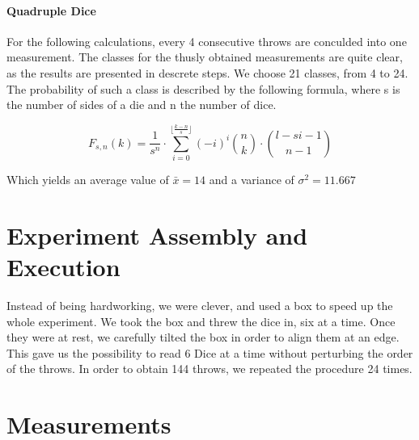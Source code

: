 \documentclass{scrreprt}
\begin{document}
\paragraph{Quadruple Dice}
For the following calculations, every 4 consecutive throws are conculded into one measurement. The classes for the thusly obtained measurements are quite clear, as the results are presented in descrete steps. We choose 21 classes, from 4 to 24.
The probability of such a class is described by the following formula\cite{dicewiki}, where s is the number of sides of a die and n the number of dice.

\begin{equation}
F_{s,n}(k)= \frac{1}{s^n}\cdot\sum_{i=0}^{\lfloor\frac{k-n}{s} \rfloor}(-i)^i\binom{n}{k}\cdot\binom{l-si-1}{n-1}
\end{equation}

Which yields an average value of $\bar{x}=14$ and a variance of $\sigma^2=11.667$

\section[The Experiment]{Experiment Assembly and Execution}
Instead of being hardworking, we were clever, and used a box to speed up the whole experiment. We took the box and threw the dice in, six at a time. Once they were at rest, we carefully tilted the box in order to align them at an edge. This gave us the possibility to read 6 Dice at a time without perturbing the order of the throws. In order to obtain 144 throws, we repeated the procedure 24 times.
\section{Measurements}
\end{document}
